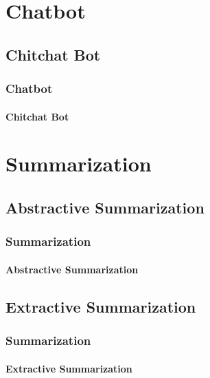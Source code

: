 \documentclass{beamer}
\begin{document}
\section{Chatbot}
\subsection{Chitchat Bot}
\begin{frame}
    \frametitle{Chatbot}
    \framesubtitle{Chitchat Bot}
\end{frame}

\section{Summarization}
\subsection{Abstractive Summarization}
\begin{frame}
    \frametitle{Summarization}
    \framesubtitle{Abstractive Summarization}
\end{frame}

\subsection{Extractive Summarization}
\begin{frame}
    \frametitle{Summarization}
    \framesubtitle{Extractive Summarization}
\end{frame}
\end{document}
